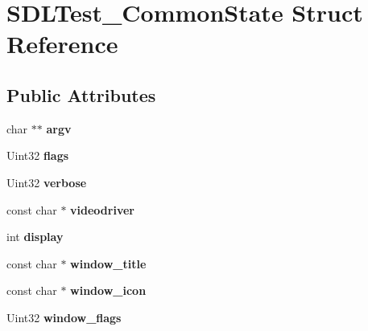 \hypertarget{structSDLTest__CommonState}{\section{S\+D\+L\+Test\+\_\+\+Common\+State Struct Reference}
\label{structSDLTest__CommonState}
}
\subsection*{Public Attributes}
\begin{DoxyCompactItemize}
\item 
\hypertarget{structSDLTest__CommonState_a5ba5d5e37ccaa16260ac91aebf0d11a4}{char $\ast$$\ast$ {\bfseries argv}}\label{structSDLTest__CommonState_a5ba5d5e37ccaa16260ac91aebf0d11a4}

\item 
\hypertarget{structSDLTest__CommonState_a97272d03558f1f74e579ec8a5cdabc5e}{Uint32 {\bfseries flags}}\label{structSDLTest__CommonState_a97272d03558f1f74e579ec8a5cdabc5e}

\item 
\hypertarget{structSDLTest__CommonState_aad4b8ebf6277cd9d3608d2e1b48e4678}{Uint32 {\bfseries verbose}}\label{structSDLTest__CommonState_aad4b8ebf6277cd9d3608d2e1b48e4678}

\item 
\hypertarget{structSDLTest__CommonState_a11a978c81526ee5bb8f553e58fc63397}{const char $\ast$ {\bfseries videodriver}}\label{structSDLTest__CommonState_a11a978c81526ee5bb8f553e58fc63397}

\item 
\hypertarget{structSDLTest__CommonState_addb3de8e2b278deed8d2309bafd30758}{int {\bfseries display}}\label{structSDLTest__CommonState_addb3de8e2b278deed8d2309bafd30758}

\item 
\hypertarget{structSDLTest__CommonState_ac239c20c6f0c9ba5d566c19026ee62d6}{const char $\ast$ {\bfseries window\+\_\+title}}\label{structSDLTest__CommonState_ac239c20c6f0c9ba5d566c19026ee62d6}

\item 
\hypertarget{structSDLTest__CommonState_ab6b2738da0ff6eb3afc5d82ccaa44c06}{const char $\ast$ {\bfseries window\+\_\+icon}}\label{structSDLTest__CommonState_ab6b2738da0ff6eb3afc5d82ccaa44c06}

\item 
\hypertarget{structSDLTest__CommonState_a9e38339b34b483087ff8d52d44a80809}{Uint32 {\bfseries window\+\_\+flags}}\label{structSDLTest__CommonState_a9e38339b34b483087ff8d52d44a80809}


\end{DoxyCompactItemize}
